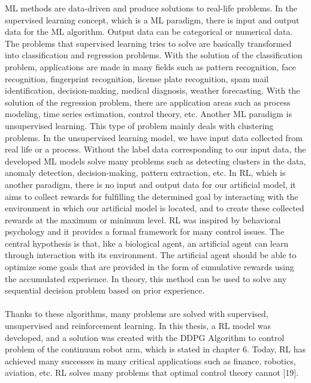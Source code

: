 \documentclass[12pt,twoside,a4]{mwbk}
\begin{document}
\noindent ML methods are data-driven and produce solutions to real-life problems. In the supervised learning concept, which is a ML paradigm, there is input and output data for the ML algorithm. Output data can be categorical or numerical data. The problems that supervised learning tries to solve are basically transformed into classification and regression problems. With the solution of the classification problem, applications are made in many fields such as pattern recognition, face recognition, fingerprint recognition, license plate recognition, spam mail identification, decision-making, medical diagnosis, weather forecasting. With the solution of the regression problem, there are application areas such as process modeling, time series estimation, control theory, etc. Another ML paradigm is unsupervised learning. This type of problem mainly deals with clustering problems. In the unsupervised learning model, we have input data collected from real life or a process. Without the label data corresponding to our input data, the developed ML models solve many problems such as detecting clusters in the data, anomaly detection, decision-making, pattern extraction, etc. In RL, which is another paradigm, there is no input and output data for our artificial model, it aims to collect rewards for fulfilling the determined goal by interacting with the environment in which our artificial model is located, and to create these collected rewards at the maximum or minimum level. RL was inspired by behavioral psychology and it provides a formal framework for many control issues. The central hypothesis is that, like a biological agent, an artificial agent can learn through interaction with its environment. The artificial agent should be able to optimize some goals that are provided in the form of cumulative rewards using the accumulated experience. In theory, this method can be used to solve any sequential decision problem based on prior experience.
\\ \\
Thanks to these algorithms, many problems are solved with supervised, unsupervised and reinforcement learning. In this thesis, a RL model was developed, and a solution was created with the DDPG Algorithm to control problem of the continuum robot arm, which is stated in chapter 6. Today, RL has achieved many successes in many critical applications such as finance, robotics, aviation, etc. RL solves many problems that optimal control theory cannot [19].
\end{document}
